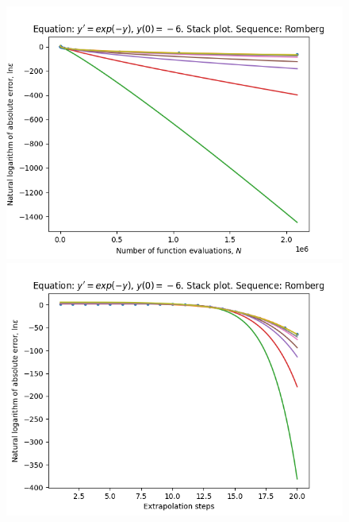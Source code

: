 \begin{figure}[H]
\centering
\begin{minipage}{0.45\textwidth}
\centering
\includegraphics[scale=0.45]{../results/emr_plots/ln_em6_hp_romberg_stack.png}
\end{minipage}
\begin{minipage}{0.45\textwidth}
\centering
\includegraphics[scale=0.45]{../results/emr_plots/ln_em6_hp_romberg_steps_stack.png}
\end{minipage}
\end{figure}

